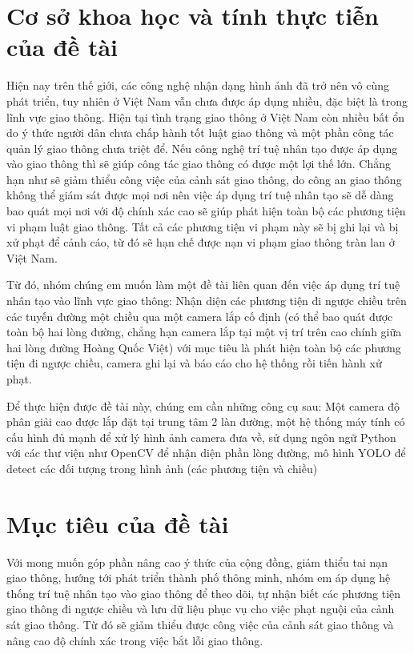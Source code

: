 \documentclass[12pt,twoside,a4paper]{article}
\begin{document}
\section{Cơ sở khoa học và tính thực tiễn của đề tài}
Hiện nay trên thế giới, các công nghệ nhận dạng hình ảnh đã trở nên vô cùng phát triển, tuy nhiên ở Việt Nam vẫn chưa được áp dụng nhiều, đặc biệt là trong lĩnh vực giao thông. Hiện tại tình trạng giao thông ở Việt Nam còn nhiều bất ổn do ý thức người dân chưa chấp hành tốt luật giao thông và một phần công tác quản lý giao thông chưa triệt để. Nếu công nghệ trí tuệ nhân tạo được áp dụng vào giao thông thì sẽ giúp công tác giao thông có được một lợi thế lớn. Chẳng hạn như sẽ giảm thiểu công việc của cảnh sát giao thông, do công an giao thông không thể giám sát được mọi nơi nên việc áp dụng trí tuệ nhân tạo sẽ dễ dàng bao quát mọi nơi với độ chính xác cao sẽ giúp phát hiện toàn bộ các phương tiện vi phạm luật giao thông. Tất cả các phương tiện vi phạm này sẽ bị ghi lại và bị xử phạt để cảnh cáo, từ đó sẽ hạn chế được nạn vi phạm giao thông tràn lan ở Việt Nam.
\par
Từ đó, nhóm chúng em muốn làm một đề tài liên quan đến việc áp dụng trí tuệ nhân tạo vào lĩnh vực giao thông: Nhận diện các phương tiện đi ngược chiều trên các tuyến đường một chiều qua một camera lắp cố định (có thể bao quát được toàn bộ hai lòng đường, chẳng hạn camera lắp tại một vị trí trên cao chính giữa hai lòng đường Hoàng Quốc Việt) với mục tiêu là phát hiện toàn bộ các phương tiện đi ngược chiều, camera ghi lại và báo cáo cho hệ thống rồi tiến hành xử phạt.
\par
Để thực hiện được đề tài này, chúng em cần những công cụ sau: Một camera độ phân giải cao được lắp đặt tại trung tâm 2 làn đường, một hệ thống máy tính có cấu hình đủ mạnh để xử lý hình ảnh camera đưa về, sử dụng ngôn ngữ Python với các thư viện như OpenCV để nhận diện phần lòng đường, mô hình YOLO để detect các đối tượng trong hình ảnh (các phương tiện và chiều)
\section{Mục tiêu của đề tài}
Với mong muốn góp phần nâng cao ý thức của cộng đồng, giảm thiểu tai nạn giao thông, hướng tới phát triển thành phố thông minh, nhóm em áp dụng hệ thống trí tuệ nhân tạo vào giao thông để theo dõi, tự nhận biết các phương tiện giao thông đi ngược chiều và lưu dữ liệu phục vụ cho việc phạt nguội của cảnh sát giao thông. Từ đó sẽ giảm thiểu được công việc của cảnh sát giao thông và nâng cao độ chính xác trong việc bắt lỗi giao thông.
\end{document}
